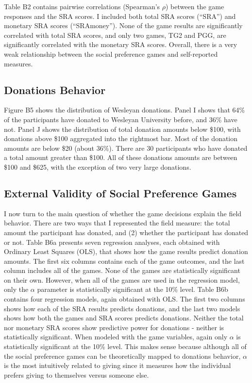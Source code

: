 \documentclass[12pt]{article}
\begin{document}
Table B2 contains pairwise correlations (Spearman\rq s \(\rho\)) between the game responses and the SRA scores. I included both total SRA scores (``SRA'') and monetary SRA scores (``SRAmoney''). None of the game results are significantly correlated with total SRA scores, and only two games, TG2 and PGG, are significantly correlated with the monetary SRA scores. Overall, there is a very weak relationship between the social preference games and self-reported measures. 

\subsection{Donations Behavior}

Figure B5 shows the distribution of Wesleyan donations. Panel I shows that 64\% of the participants have donated to Wesleyan University before, and 36\% have not. Panel J shows the distribution of total donation amounts below \$100, with donations above \$100 aggregated into the rightmost bar. Most of the donation amounts are below \$20 (about 36\%). There are 30 participants who have donated a total amount greater than \$100. All of these donations amounts are between \$100 and \$625, with the exception of two very large donations.

\subsection{External Validity of Social Preference Games}
I now turn to the main question of whether the game decisions explain the field behavior. There are two ways that I represented the field measure: the total amount the participant has donated, and (2) whether the participant has donated or not. Table B6a presents seven regression analyses, each obtained with Ordinary Least Squares (OLS), that shows how the game results predict donation amounts. The first six columns contains each of the game outcomes, and the last column includes all of the games. None of the games are statistically significant on their own. However, when all of the games are used in the regression model, only the \(\alpha\) parameter is statistically significant at the 10\% level. Table B6b contains four regression models, again obtained with OLS. The first two columns shows how each of the SRA results predicts donations, and the last two models shows how both the games and SRA scores predicts donations. Neither the total nor monetary SRA scores show predictive power for donations - neither is statistically significant. When modeled with the game variables, again only \(\alpha\) is statistically significant at the 10\% level. This makes sense because although all of the social preference games can be theoretically mapped to donations behavior, \(\alpha\) is the most intuitively related to giving since it measures how the individual prefers giving to themselves versus someone else. 
\end{document}
